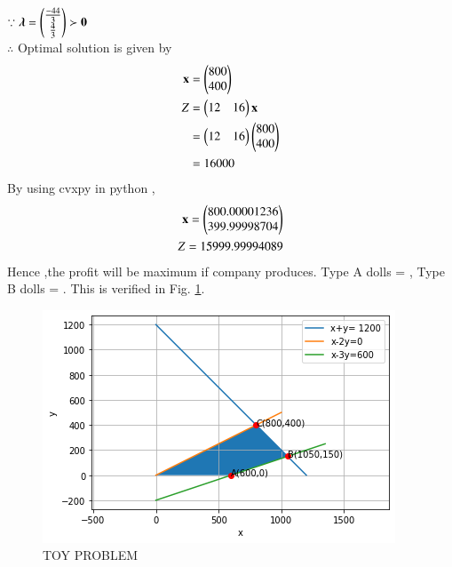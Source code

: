 $\because \boldsymbol{\lambda}=\begin{pmatrix}\frac{-44}{3} \\ \frac{4}{3}\end{pmatrix} \succ \mathbf{0}$ 
\\
$\therefore$ Optimal solution is given by
\begin{align}
    \mathbf{x} &= \begin{pmatrix}800\\400\end{pmatrix} \\
    Z &= \begin{pmatrix}12 & 16\end{pmatrix}\mathbf{x} \\
    &= \begin{pmatrix}12 & 16\end{pmatrix}\begin{pmatrix}800 \\ 400\end{pmatrix} \\
    &= 16000
\end{align}
By using cvxpy in python ,
\begin{align}
    \mathbf{x}=\begin{pmatrix}800.00001236\\399.99998704\end{pmatrix}\\
    Z = 15999.99994089
\end{align}
Hence ,the profit will be maximum if company produces.
Type A dolls = ,
Type B dolls = .
This is verified in Fig. \ref{opt/32/fig:TOY PROBLEM}.	
\begin{figure}[!ht]
\centering
\includegraphics[width=\columnwidth]{solutions/su2021/2/32/download.png}
\caption{TOY PROBLEM}
\label{opt/32/fig:TOY PROBLEM}	
\end{figure}

